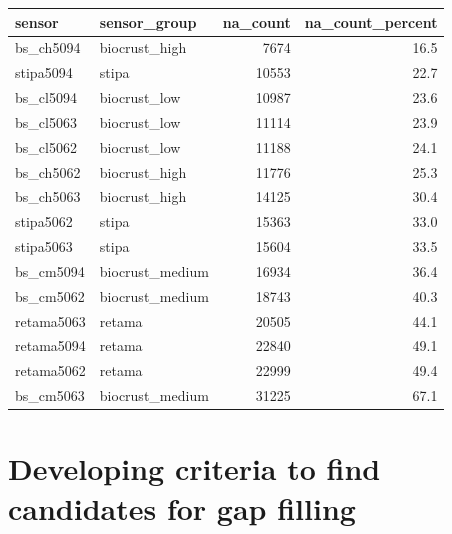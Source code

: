 \documentclass[]{article}
\begin{document}
\begin{tabular}[t]{l|l|r|r}
\hline
sensor & sensor\_group & na\_count & na\_count\_percent\\
\hline
bs\_ch5094 & biocrust\_high & 7674 & 16.5\\
\hline
stipa5094 & stipa & 10553 & 22.7\\
\hline
bs\_cl5094 & biocrust\_low & 10987 & 23.6\\
\hline
bs\_cl5063 & biocrust\_low & 11114 & 23.9\\
\hline
bs\_cl5062 & biocrust\_low & 11188 & 24.1\\
\hline
bs\_ch5062 & biocrust\_high & 11776 & 25.3\\
\hline
bs\_ch5063 & biocrust\_high & 14125 & 30.4\\
\hline
stipa5062 & stipa & 15363 & 33.0\\
\hline
stipa5063 & stipa & 15604 & 33.5\\
\hline
bs\_cm5094 & biocrust\_medium & 16934 & 36.4\\
\hline
bs\_cm5062 & biocrust\_medium & 18743 & 40.3\\
\hline
retama5063 & retama & 20505 & 44.1\\
\hline
retama5094 & retama & 22840 & 49.1\\
\hline
retama5062 & retama & 22999 & 49.4\\
\hline
bs\_cm5063 & biocrust\_medium & 31225 & 67.1\\
\hline
\end{tabular}

\hypertarget{developing-criteria-to-find-candidates-for-gap-filling}{%
\section{Developing criteria to find candidates for gap
filling}\label{developing-criteria-to-find-candidates-for-gap-filling}}
\end{document}
